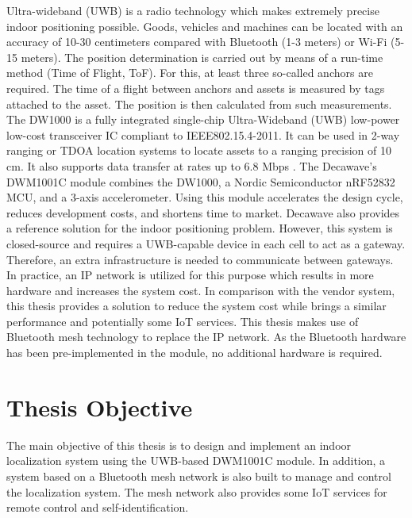 \documentclass[\main/main.tex]{subfiles}
\begin{document}
Ultra-wideband (UWB) is a radio technology which makes extremely precise indoor positioning possible. Goods, vehicles and machines can be located with an accuracy of 10-30 centimeters compared with Bluetooth (1-3 meters) or Wi-Fi (5-15 meters). The position determination is carried out by means of a run-time method (Time of Flight, ToF). For this, at least three so-called anchors are required. The time of a flight between anchors and assets is measured by tags attached to the asset. The position is then calculated from such measurements.
\newline\newline
The DW1000 is a fully integrated single-chip Ultra-Wideband (UWB) low-power low-cost transceiver IC compliant to IEEE802.15.4-2011. It can be used in 2-way ranging or TDOA location systems to locate assets to a ranging precision of 10 cm. It also supports data transfer at rates up to 6.8 Mbps \cite{decawave:dw1000_datasheet}.
\newline\newline
The Decawave's DWM1001C module combines the DW1000, a Nordic Semiconductor nRF52832 MCU, and a 3-axis accelerometer. Using this module accelerates the design cycle, reduces development costs, and shortens time to market.
\newline\newline
Decawave also provides a reference solution for the indoor positioning problem. However, this system is closed-source and requires a UWB-capable device in each cell to act as a gateway. Therefore, an extra infrastructure is needed to communicate between gateways. In practice, an IP network is utilized for this purpose which results in more hardware and increases the system cost.
In comparison with the vendor system, this thesis provides a solution to reduce the system cost while brings a similar performance and potentially some IoT services. This thesis makes use of Bluetooth mesh technology to replace the IP network. As the Bluetooth hardware has been pre-implemented in the module, no additional hardware is required.

\section{Thesis Objective}
The main objective of this thesis is to design and implement an indoor localization system using the UWB-based DWM1001C module. In addition, a system based on a Bluetooth mesh network is also built to manage and control the localization system. The mesh network also provides some IoT services for remote control and self-identification.
\end{document}
